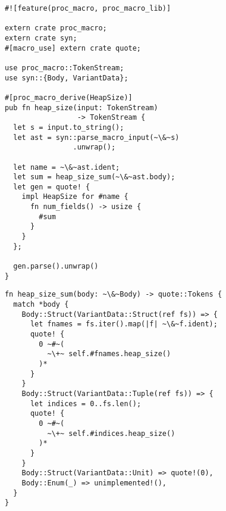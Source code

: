 \documentclass[usepdftitle=false]{beamer}
\renewcommand{\&}{\makebox[\widthof{\ampersand}][c]{\scalebox{0.9}[1.0]{\Book\ampersand}}}
\newcommand{\+}{\makebox[\widthof{+}][c]{\raisebox{-.2\height}{\scalefont{1.5}\Light+}}}
\begin{document}
\begin{frame}[fragile,shrink=10]
  \hspace{-1.25em}
  \begin{minipage}[t]{0.50\textwidth}
    \begin{verbatim}
      #![feature(proc_macro, proc_macro_lib)]

      extern crate proc_macro;
      extern crate syn;
      #[macro_use] extern crate quote;

      use proc_macro::TokenStream;
      use syn::{Body, VariantData};

      #[proc_macro_derive(HeapSize)]
      pub fn heap_size(input: TokenStream)
                       -> TokenStream {
        let s = input.to_string();
        let ast = syn::parse_macro_input(~\&~s)
                      .unwrap();

        let name = ~\&~ast.ident;
        let sum = heap_size_sum(~\&~ast.body);
        let gen = quote! {
          impl HeapSize for #name {
            fn num_fields() -> usize {
              #sum
            }
          }
        };

        gen.parse().unwrap()
      }
    \end{verbatim}
  \end{minipage}
  \begin{minipage}[t]{0.45\textwidth}
    \begin{verbatim}
      fn heap_size_sum(body: ~\&~Body) -> quote::Tokens {
        match *body {
          Body::Struct(VariantData::Struct(ref fs)) => {
            let fnames = fs.iter().map(|f| ~\&~f.ident);
            quote! {
              0 ~#~(
                ~\+~ self.#fnames.heap_size()
              )*
            }
          }
          Body::Struct(VariantData::Tuple(ref fs)) => {
            let indices = 0..fs.len();
            quote! {
              0 ~#~(
                ~\+~ self.#indices.heap_size()
              )*
            }
          }
          Body::Struct(VariantData::Unit) => quote!(0),
          Body::Enum(_) => unimplemented!(),
        }
      }
    \end{verbatim}
  \end{minipage}
\end{frame}
\end{document}
